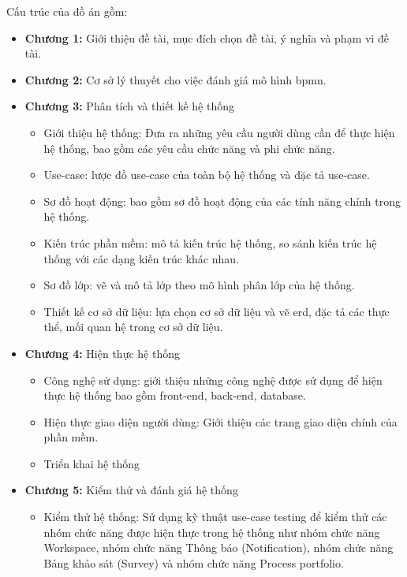 Cấu trúc của đồ án gồm:
\begin{itemize}
      \item \textbf{Chương 1:} Giới thiệu đề tài, mục đích chọn đề tài, ý nghĩa và phạm vi đề tài.
      \item \textbf{Chương 2:} Cơ sở lý thuyết cho việc đánh giá mô hình \acrshort{bpmn}.
      \item \textbf{Chương 3:} Phân tích và thiết kế hệ thống
          \begin{itemize}
            \item Giới thiệu hệ thống: Đưa ra những yêu cầu người dùng cần để thực hiện hệ thống,
                  bao gồm các yêu cầu chức năng và phi chức năng.
            \item Use-case: lược đồ use-case của toàn bộ hệ thống và đặc tả use-case.
            \item Sơ đồ hoạt động: bao gồm sơ đồ hoạt động của các tính năng chính trong hệ
                  thống.
            \item Kiến trúc phần mềm: mô tả kiến trúc hệ thống, so sánh kiến trúc hệ thống với
                  các dạng kiến trúc khác nhau.
            \item Sơ đồ lớp: vẽ và mô tả lớp theo mô hình phân lớp của hệ thống.
            \item Thiết kế cơ sở dữ liệu: lựa chọn cơ sở dữ liệu và vẽ \acrfull*{erd}, đặc tả các thực thể,
                  mối quan hệ trong cơ sở dữ liệu.
          \end{itemize}
      \item \textbf{Chương 4:} Hiện thực hệ thống
          \begin{itemize}
            \item Công nghệ sử dụng: giới thiệu những công nghệ được sử dụng để hiện thực hệ
                  thống bao gồm front-end, back-end, database.
            \item Hiện thực giao diện người dùng: Giới thiệu các trang giao diện chính của phần
                  mềm.
            \item Triển khai hệ thống
          \end{itemize}
      \item \textbf{Chương 5:} Kiểm thử và đánh giá hệ thống
          \begin{itemize}
            \item Kiểm thử hệ thống: Sử dụng kỹ thuật use-case testing để kiểm thử các nhóm chức năng được hiện thực trong hệ thống như nhóm chức năng Workspace, nhóm chức năng Thông báo (Notification), nhóm chức năng Bảng khảo sát (Survey) và nhóm chức năng Process portfolio.

\end{itemize}
\end{itemize}
